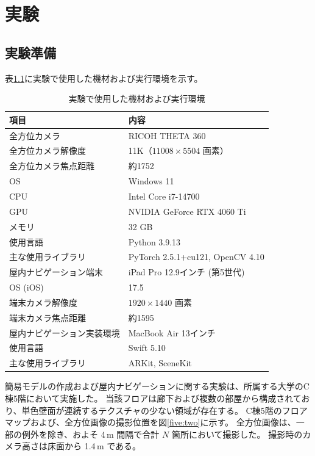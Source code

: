 \chapter{実験}

\section{実験準備}
表\ref{five:one}に実験で使用した機材および実行環境を示す。
\begin{table}[H]
  \centering
  \caption{実験で使用した機材および実行環境}
  \label{five:one}
  \begin{tabular}{l|l}
    \hline
    項目 & 内容 \\
    \hline \hline
    全方位カメラ & RICOH THETA 360 \\
    全方位カメラ解像度 & 11K（$11008 \times 5504$ 画素）\\
    全方位カメラ焦点距離 & 約1752 \\
    \hline
    OS & Windows 11 \\
    CPU & Intel Core i7-14700 \\
    GPU & NVIDIA GeForce RTX 4060 Ti \\
    メモリ & 32 GB \\
    使用言語 & Python 3.9.13 \\
    主な使用ライブラリ & PyTorch 2.5.1+cu121, OpenCV 4.10 \\
    \hline
    屋内ナビゲーション端末 & iPad Pro 12.9インチ (第5世代) \\
    OS (iOS) & 17.5 \\
    端末カメラ解像度 & $1920 \times 1440$ 画素 \\
    端末カメラ焦点距離 & 約1595 \\
    \hline
    屋内ナビゲーション実装環境 & MacBook Air 13インチ \\
    使用言語 & Swift 5.10 \\
    主な使用ライブラリ & ARKit, SceneKit \\
    \hline
  \end{tabular}
\end{table}

簡易モデルの作成および屋内ナビゲーションに関する実験は、所属する大学のC棟5階において実施した。
当該フロアは廊下および複数の部屋から構成されており、単色壁面が連続するテクスチャの少ない領域が存在する。
C棟5階のフロアマップおよび、全方位画像の撮影位置を図\ref{five:two}に示す。
全方位画像は、一部の例外を除き、およそ 4\,m 間隔で合計 $N$ 箇所において撮影した。
撮影時のカメラ高さは床面から 1.4\,m である。

